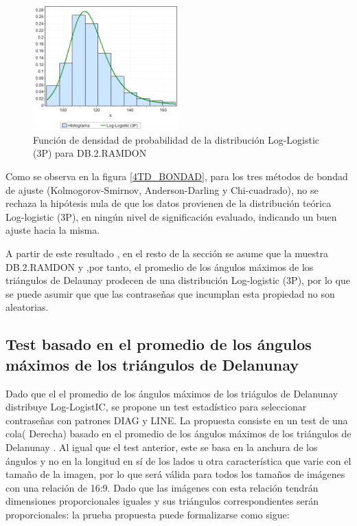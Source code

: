 \documentclass[12pt]{report}
\begin{document}
\begin{figure}[ht]
	\centering
	
	\includegraphics[width=0.5\textwidth]{4td_fdp.png}
	\caption{Función de densidad de probabilidad de la  distribución Log-Logistic (3P) para DB.2.RAMDON}
	\label{4TD_FDP}
\end{figure}

Como se observa en la figura  \ref{4TD_BONDAD}, para los tres métodos de bondad de ajuste (Kolmogorov-Smirnov, Anderson-Darling y Chi-cuadrado), no se rechaza la hipótesis nula de que los datos provienen de la distribución teórica Log-logistic (3P), en ningún nivel de significación evaluado, indicando un buen ajuste hacia la misma.

A partir de este resultado , en el resto de la sección se asume que la muestra  DB.2.RAMDON y ,por tanto, el promedio de los ángulos máximos de los triángulos de Delaunay  prodecen de una distribución Log-logistic (3P), por lo que se puede asumir que que las contraseñas que incumplan esta propiedad no son aleatorias.

\subsection{Test basado en el promedio de los ángulos máximos de los triángulos de Delanunay}
Dado  que el el promedio de los ángulos máximos de los triágulos de Delanunay distribuye Log-LogistIC, se propone un  test estadístico para seleccionar contraseñas con patrones DIAG y LINE. La propuesta consiste en un test de una cola( Derecha) basado en el promedio de los ángulos máximos de los triángulos de Delanunay .
Al igual que  el test anterior, este se basa en la anchura de los ángulos y no en la longitud en sí de los lados u otra característica que varie con el tamaño de la imagen, por lo que será válida para todos los tamaños de imágenes con una relación de 16:9. Dado que las imágenes con esta relación tendrán dimensiones proporcionales iguales y sus triángulos correspondientes serán proporcionales: la prueba propuesta puede formalizarse como sigue:
\end{document}

